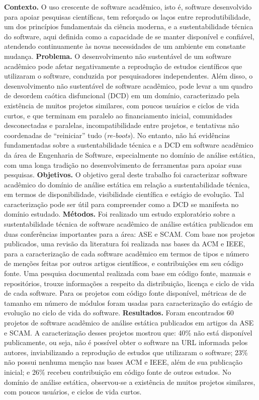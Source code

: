 \textbf{Contexto.}
O uso crescente de software acadêmico, isto é,
software desenvolvido para apoiar pesquisas científicas,
tem reforçado os laços entre
reprodutibilidade, um dos princípios fundamentais da ciência moderna,
e a sustentabilidade técnica do software,
aqui definida como a capacidade de se manter disponível e confiável,
atendendo continuamente às novas necessidades de um ambiente em constante
mudança.
%
\textbf{Problema.}
O desenvolvimento não sustentável de um software acadêmico pode
afetar negativamente a reprodução de estudos científicos que utilizaram o
software,
conduzida por pesquisadores independentes.
Além disso, o desenvolvimento não sustentável de software acadêmico,
pode levar a um quadro de desordem caótica disfuncional (DCD) em um domínio,
caracterizado pela existência de muitos projetos similares, com poucos
usuários e ciclos de vida curtos, e que terminam em paralelo ao
financiamento
inicial, comunidades desconectadas e paralelas, incompatibilidade entre
projetos, e tentativas não coordenadas de ``reiniciar'' tudo
({\it re-boots}).
%
No entanto, não há evidências fundamentadas sobre a sustentabilidade técnica
e a DCD em software acadêmico da área de Engenharia de Software,
especialmente
no domínio de análise estática, com uma longa tradição no
desenvolvimento de ferramentas para apoiar suas pesquisas.
%
\textbf{Objetivos.}
O objetivo geral deste trabalho foi
caracterizar software acadêmico do domínio de análise estática
em relação a sustentabilidade técnica,
em termos de disponibilidade, visibilidade científica e estágio de evolução.
Tal caracterização pode ser útil para compreender como a DCD se manifesta
no domínio estudado.
%
\textbf{Métodos.}
Foi realizado um estudo exploratório sobre a sustentabilidade
técnica de software acadêmico de análise estática
publicados em duas conferências importantes para a área: ASE e SCAM.
%
Com base nos projetos publicados,
uma revisão da literatura foi realizada nas bases da ACM e IEEE,
para a caracterização de cada software acadêmico
em termos de tipos e número de menções feitas por outros artigos
científicos,
e contribuições em seu código fonte.
Uma pesquisa documental realizada com base em
código fonte, manuais e repositórios, trouxe informações a respeito da
distribuição, licença e ciclo de vida de cada software.
Para os projetos com código fonte disponível, métricas de
de tamanho em número de módulos foram usadas para caracterização do
estágio de evolução no ciclo de vida do software.
%
\textbf{Resultados.}
Foram encontrados 60 projetos de software acadêmico de análise estática
publicados em artigos da ASE e SCAM.
%
A caracterização desses projetos mostrou que:
40\% não está disponível publicamente, ou seja,
não é possível obter o software na URL informada pelos autores,
inviabilizando a reprodução de estudos que utilizaram o software;
%
23\% não possui nenhuma menção nas bases ACM e IEEE, além de sua publicação
inicial; e
26\% recebeu contribuição em código fonte de outros estudos.
No domínio de análise estática, observou-se a existência de muitos projetos
similares, com poucos usuários, e ciclos de vida curtos.

